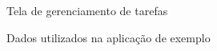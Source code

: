 \begin{figure}
	\centering
	\label{fig:app_tela_tarefas}
	\caption{Tela de gerenciamento de tarefas}
\end{figure}

\begin{figure}
	\centering
	\label{fig:task_domain}
	\caption{Dados utilizados na aplicação de exemplo}
\end{figure}